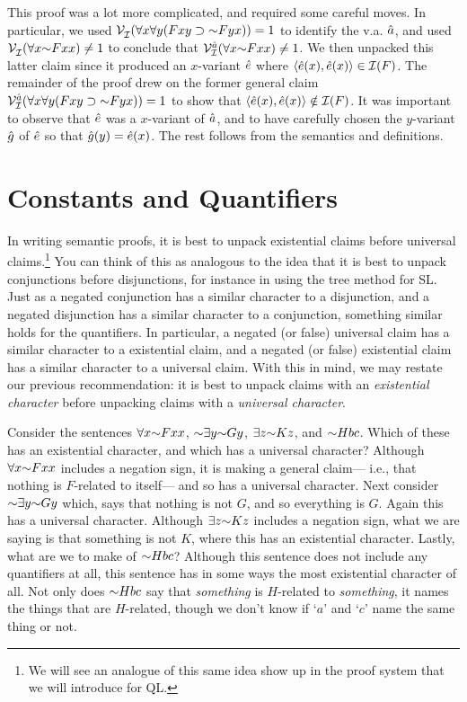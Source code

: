 This proof was a lot more complicated, and required some careful moves.
In particular, we used $\VV{\I}{}(\qt{\forall}{x}\qt{\forall}{y}(Fxy \eif \enot Fyx))=1$ to identify the v.a. $\hat{a}$, and used $\VV{\I}{}(\qt{\forall}{x}\enot Fxx)\neq 1$ to conclude that $\VV{\I}{\va{a}}(\qt{\forall}{x}\enot Fxx)\neq 1$. 
We then unpacked this latter claim since it produced an $x$-variant $\hat{e}$ where $\langle\hat{e}(x),\hat{e}(x)\rangle\in\mathcal{I}(F)$.
The remainder of the proof drew on the former general claim $\VV{\I}{\va{a}}(\qt{\forall}{x}\qt{\forall}{y}(Fxy \eif \enot Fyx))=1$ to show that $\langle\hat{e}(x),\hat{e}(x)\rangle\notin\mathcal{I}(F)$.  
It was important to observe that $\hat{e}$ was a $x$-variant of $\hat{a}$, and to have carefully chosen the $y$-variant $\hat{g}$ of $\hat{e}$ so that $\hat{g}(y)=\hat{e}(x)$.
The rest follows from the semantics and definitions.





\section{Constants and Quantifiers}

In writing semantic proofs, it is best to unpack existential claims before universal claims.\footnote{We will see an analogue of this same idea show up in the proof system that we will introduce for QL.}
You can think of this as analogous to the idea that it is best to unpack conjunctions before disjunctions, for instance in using the tree method for SL.
Just as a negated conjunction has a similar character to a disjunction, and a negated disjunction has a similar character to a conjunction, something similar holds for the quantifiers.
In particular, a negated (or false) universal claim has a similar character to a existential claim, and a negated (or false) existential claim has a similar character to a universal claim. 
With this in mind, we may restate our previous recommendation: it is best to unpack claims with an \textit{existential character} before unpacking claims with a \textit{universal character}.

Consider the sentences $\qt{\forall}{x}\enot Fxx$, $\enot \qt{\exists}{y} \enot Gy$, $\exists z \enot Kz$, and $\enot Hbc$.
Which of these has an existential character, and which has a universal character?
Although $\qt{\forall}{x}\enot Fxx$ includes a negation sign, it is making a general claim--- i.e., that nothing is $F$-related to itself--- and so has a universal character.
Next consider $\enot \qt{\exists}{y} \enot Gy$ which, says that nothing is not $G$, and so everything is $G$.
Again this has a universal character.
Although $\exists z \enot Kz$ includes a negation sign, what we are saying is that something is not $K$, where this has an existential character. 
Lastly, what are we to make of $\enot Hbc$?
Although this sentence does not include any quantifiers at all, this sentence has in some ways the most existential character of all.
Not only does $\enot Hbc$ say that \textit{something} is $H$-related to \textit{something}, it names the things that are $H$-related, though we don't know if `$a$' and `$c$' name the same thing or not.

